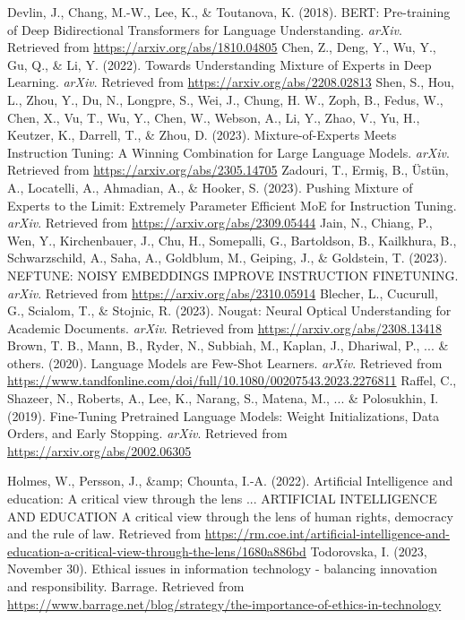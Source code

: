 \documentclass[]{article}
\begin{document}
\begin{thebibliography}{9}
 Devlin, J., Chang, M.-W., Lee, K., \& Toutanova, K. (2018). BERT: Pre-training of Deep Bidirectional Transformers for Language Understanding. \textit{arXiv}. Retrieved from \url{https://arxiv.org/abs/1810.04805}
Chen, Z., Deng, Y., Wu, Y., Gu, Q., \& Li, Y. (2022). Towards Understanding Mixture of Experts in Deep Learning. \textit{arXiv}. Retrieved from \url{https://arxiv.org/abs/2208.02813}
Shen, S., Hou, L., Zhou, Y., Du, N., Longpre, S., Wei, J., Chung, H. W., Zoph, B., Fedus, W., Chen, X., Vu, T., Wu, Y., Chen, W., Webson, A., Li, Y., Zhao, V., Yu, H., Keutzer, K., Darrell, T., \& Zhou, D. (2023). Mixture-of-Experts Meets Instruction Tuning: A Winning Combination for Large Language Models. \textit{arXiv}. Retrieved from \url{https://arxiv.org/abs/2305.14705}
Zadouri, T., Ermiş, B., Üstün, A., Locatelli, A., Ahmadian, A., \& Hooker, S. (2023). Pushing Mixture of Experts to the Limit: Extremely Parameter Efficient MoE for Instruction Tuning. \textit{arXiv}. Retrieved from \url{https://arxiv.org/abs/2309.05444}
Jain, N., Chiang, P., Wen, Y., Kirchenbauer, J., Chu, H., Somepalli, G., Bartoldson, B., Kailkhura, B., Schwarzschild, A., Saha, A., Goldblum, M., Geiping, J., \& Goldstein, T. (2023). NEFTUNE: NOISY EMBEDDINGS IMPROVE INSTRUCTION FINETUNING. \textit{arXiv}. Retrieved from \url{https://arxiv.org/abs/2310.05914}
Blecher, L., Cucurull, G., Scialom, T., \& Stojnic, R. (2023). Nougat: Neural Optical Understanding for Academic Documents. \textit{arXiv}. Retrieved from \url{https://arxiv.org/abs/2308.13418}
 Brown, T. B., Mann, B., Ryder, N., Subbiah, M., Kaplan, J., Dhariwal, P., ... \& others. (2020). Language Models are Few-Shot Learners. \textit{arXiv}. Retrieved from \url{https://www.tandfonline.com/doi/full/10.1080/00207543.2023.2276811}
 Raffel, C., Shazeer, N., Roberts, A., Lee, K., Narang, S., Matena, M., ... \& Polosukhin, I. (2019). Fine-Tuning Pretrained Language Models: Weight Initializations, Data Orders, and Early Stopping. \textit{arXiv}. Retrieved from \url{https://arxiv.org/abs/2002.06305}

 Holmes, W., Persson, J., \&amp; Chounta, I.-A. (2022). Artificial Intelligence and education: A critical view through the lens ... ARTIFICIAL INTELLIGENCE AND EDUCATION A critical view through the lens of human rights, democracy and the rule of law. Retrieved from \url{https://rm.coe.int/artificial-intelligence-and-education-a-critical-view-through-the-lens/1680a886bd}
 Todorovska, I. (2023, November 30). Ethical issues in information technology - balancing innovation and responsibility. Barrage. Retrieved from \url{https://www.barrage.net/blog/strategy/the-importance-of-ethics-in-technology}


\end{thebibliography}
\end{document}
